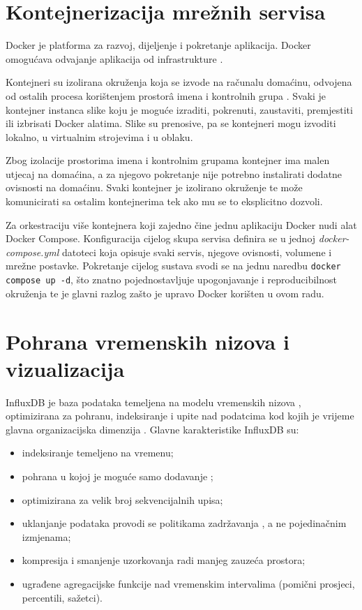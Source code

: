 \section{Kontejnerizacija mrežnih servisa}
Docker je platforma za razvoj, dijeljenje i pokretanje aplikacija. Docker omogućava odvajanje aplikacija od infrastrukture \cite{docker_docs}.

Kontejneri su izolirana okruženja koja se izvode na računalu domaćinu, odvojena od ostalih procesa korištenjem prostorâ imena  i kontrolnih grupa . Svaki je kontejner instanca 
slike  koju je moguće izraditi, pokrenuti, zaustaviti, premjestiti ili izbrisati Docker alatima. Slike su prenosive, pa se kontejneri mogu izvoditi lokalno, u virtualnim strojevima i u oblaku.

Zbog izolacije prostorima imena i kontrolnim grupama kontejner ima malen utjecaj na domaćina, a za njegovo pokretanje nije potrebno instalirati dodatne ovisnosti na domaćinu. Svaki kontejner je 
izolirano okruženje te može komunicirati sa ostalim kontejnerima tek ako mu se to eksplicitno dozvoli.

Za orkestraciju više kontejnera koji zajedno čine jednu aplikaciju Docker nudi alat Docker Compose. Konfiguracija cijelog skupa servisa definira se u jednoj 
\textit{docker-compose.yml} datoteci koja opisuje svaki servis, njegove ovisnosti, volumene i mrežne postavke. Pokretanje cijelog sustava svodi se na jednu naredbu 
\texttt{docker compose up -d}, što znatno pojednostavljuje upogonjavanje i reproducibilnost okruženja te je glavni razlog zašto je upravo Docker korišten u ovom radu.

\section{Pohrana vremenskih nizova i vizualizacija}
InfluxDB je baza podataka temeljena na modelu vremenskih nizova , optimizirana za pohranu, indeksiranje i upite nad podatcima kod kojih je vrijeme glavna
organizacijska dimenzija \cite{influxdb_docs}. Glavne karakteristike InfluxDB su:
\begin{itemize}
    \item indeksiranje temeljeno na vremenu;
    \item pohrana u kojoj je moguće samo dodavanje ;
    \item optimizirana za velik broj sekvencijalnih upisa;
    \item uklanjanje podataka provodi se politikama zadržavanja , a ne pojedinačnim izmjenama;
    \item kompresija i smanjenje uzorkovanja  radi manjeg zauzeća prostora;
    \item ugrađene agregacijske funkcije nad vremenskim intervalima (pomični prosjeci, percentili, sažetci).
\end{itemize}

